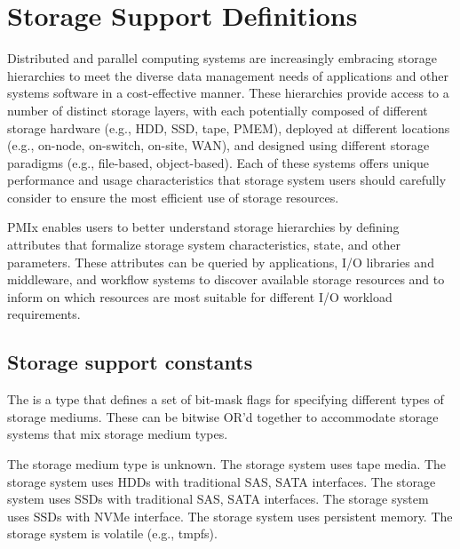 \chapter{Storage Support Definitions}
\label{chap:api_storage}

Distributed and parallel computing systems are increasingly embracing storage hierarchies to meet the diverse data management needs of applications and other systems software in a cost-effective manner.
These hierarchies provide access to a number of distinct storage layers, with each potentially composed of different storage hardware (e.g., HDD, SSD, tape, PMEM), deployed at different locations (e.g., on-node, on-switch, on-site, WAN), and designed using different storage paradigms (e.g., file-based, object-based).
Each of these systems offers unique performance and usage characteristics that storage system users should carefully consider to ensure the most efficient use of storage resources.

PMIx enables users to better understand storage hierarchies by defining attributes that formalize storage system characteristics, state, and other parameters.
These attributes can be queried by applications, I/O libraries and middleware, and workflow systems to discover available storage resources and to inform on which resources are most suitable for different I/O workload requirements.

\section{Storage support constants}


The  is a  type that defines a set of bit-mask flags for specifying different types of storage mediums. These can be bitwise OR'd together to accommodate storage systems that mix storage medium types.

\begin{constantdesc}
%
The storage medium type is unknown.
%
The storage system uses tape media.
%
The storage system uses HDDs with traditional SAS, SATA interfaces.
%
The storage system uses SSDs with traditional SAS, SATA interfaces.
%
The storage system uses SSDs with NVMe interface.
%
The storage system uses persistent memory.
%
The storage system is volatile (e.g., tmpfs).
%
\end{constantdesc}

